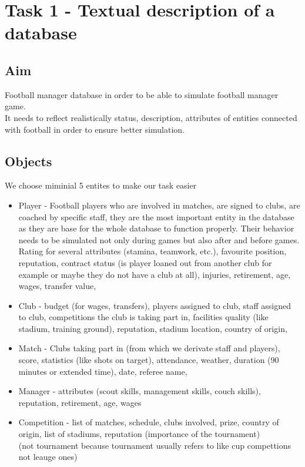 \documentclass{report}
\begin{document}
\chapter{Task 1 - Textual description of a database}
\section{Aim}

Football manager database in order to be able to simulate football manager game. \\ 
It needs to reflect realistically status, description, attributes of entities connected with football in order to ensure better simulation. \\ 


\section{Objects}
We choose miminial 5 entites to make our task easier \\ 
\begin{itemize}
    \item Player - Football players who are involved in matches, are signed to clubs, are coached by specific staff, they are the most important entity in the database as they are base for the whole database to function properly. Their behavior needs to be simulated not only during games but also after and before games.\\
    Rating for several attributes (stamina, teamwork, etc.), favourite position, reputation, contract status (is player loaned out from another club for example or maybe they do not have a club at all), injuries, retirement, age, wages, transfer value, 
    \item Club - budget (for wages, transfers), players assigned to club, staff assigned to club, competitions the club is taking part in, facilities quality (like stadium, training ground), reputation, stadium location, country of origin,
    \item Match - Clubs taking part in (from which we derivate staff and players), score, statistics (like shots on target), attendance, weather, duration (90 minutes or extended time), date, referee name,
    \item Manager - attributes (scout skills, management skills, couch skills), reputation, retirement, age, wages
    \item Competition - list of matches, schedule, clubs involved, prize, country of origin, list of stadiums, reputation (importance of the tournament)\\
    (not tournament because tournament usually refers to like cup compettions not leauge ones)
\end{itemize} 
\end{document}
